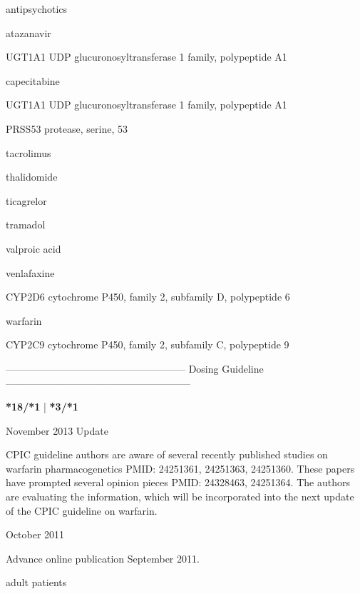 \documentclass{resume} %
\begin{document}
\begin{rSection}{ antipsychotics }
\begin{rSection}{ atazanavir }
\begin{rSubsection}{ UGT1A1 }{ UDP glucuronosyltransferase 1 family, polypeptide A1 }{}{}
\begin{rSection}{ capecitabine }
\begin{rSubsection}{ UGT1A1 }{ UDP glucuronosyltransferase 1 family, polypeptide A1 }{}{}
\begin{rSubsection}{ PRSS53 }{ protease, serine, 53 }{}{}
\begin{rSection}{ tacrolimus }
\begin{rSection}{ thalidomide }
\begin{rSection}{ ticagrelor }
\begin{rSection}{ tramadol }
\begin{rSection}{ valproic acid }
\begin{rSection}{ venlafaxine }
\begin{rSubsection}{ CYP2D6 }{ cytochrome P450, family 2, subfamily D, polypeptide 6 }{}{}
\end{rSubsection}
\end{rSection}\begin{rSection}{ warfarin }
\item[]
\begin{rSubsection}{ CYP2C9 }{ cytochrome P450, family 2, subfamily C, polypeptide 9 }{}{}
\item[]
\item[] ------------------------------------------------------ Dosing Guideline --------------------------------------------------------\newline
\item[]
\item[] \textbf{ *18/*1 } | \textbf{ *3/*1 }
\item November 2013 Update
 \newline
\item CPIC guideline authors are aware of several recently published studies on warfarin pharmacogenetics PMID: 24251361, 24251363, 24251360. These papers have prompted several opinion pieces PMID: 24328463, 24251364. The authors are evaluating the information, which will be incorporated into the next update of the CPIC guideline on warfarin.
 \newline
\item October 2011
 \newline
\item Advance online publication September 2011. 
 \newline
\item adult patients
 \newline

\end{rSubsection}
\end{rSection}
\end{rSection}
\end{rSection}
\end{rSection}
\end{rSection}
\end{rSection}
\end{rSubsection}
\end{rSubsection}
\end{rSection}
\end{rSubsection}
\end{rSection}
\end{rSection}
\end{document}
